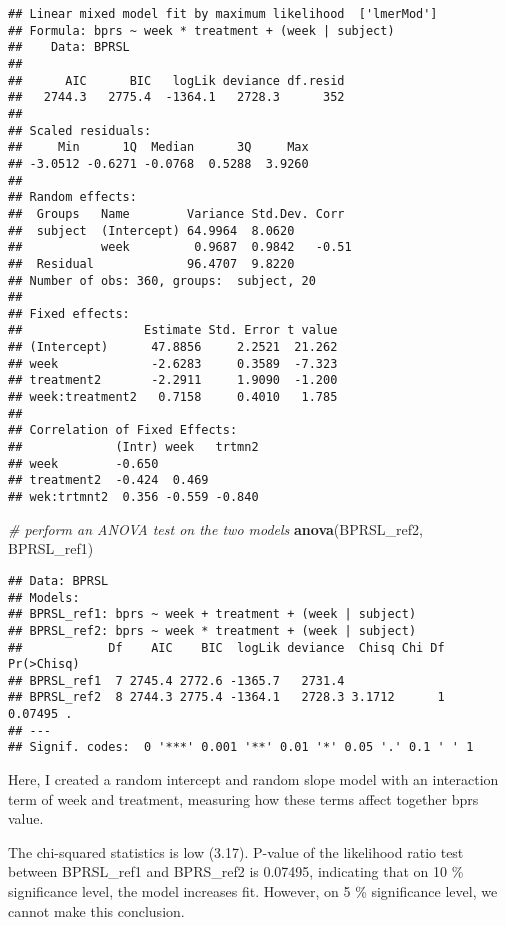 \documentclass[]{article}
\newenvironment{Shaded}{\begin{snugshade}}{\end{snugshade}}
\newcommand{\CommentTok}[1]{\textcolor[rgb]{0.56,0.35,0.01}{\textit{#1}}}
\newcommand{\KeywordTok}[1]{\textcolor[rgb]{0.13,0.29,0.53}{\textbf{#1}}}
\newcommand{\NormalTok}[1]{#1}
\begin{document}
\begin{verbatim}
## Linear mixed model fit by maximum likelihood  ['lmerMod']
## Formula: bprs ~ week * treatment + (week | subject)
##    Data: BPRSL
## 
##      AIC      BIC   logLik deviance df.resid 
##   2744.3   2775.4  -1364.1   2728.3      352 
## 
## Scaled residuals: 
##     Min      1Q  Median      3Q     Max 
## -3.0512 -0.6271 -0.0768  0.5288  3.9260 
## 
## Random effects:
##  Groups   Name        Variance Std.Dev. Corr 
##  subject  (Intercept) 64.9964  8.0620        
##           week         0.9687  0.9842   -0.51
##  Residual             96.4707  9.8220        
## Number of obs: 360, groups:  subject, 20
## 
## Fixed effects:
##                 Estimate Std. Error t value
## (Intercept)      47.8856     2.2521  21.262
## week             -2.6283     0.3589  -7.323
## treatment2       -2.2911     1.9090  -1.200
## week:treatment2   0.7158     0.4010   1.785
## 
## Correlation of Fixed Effects:
##             (Intr) week   trtmn2
## week        -0.650              
## treatment2  -0.424  0.469       
## wek:trtmnt2  0.356 -0.559 -0.840
\end{verbatim}

\begin{Shaded}
\begin{Highlighting}[]
\CommentTok{# perform an ANOVA test on the two models}
\KeywordTok{anova}\NormalTok{(BPRSL_ref2, BPRSL_ref1)}
\end{Highlighting}
\end{Shaded}

\begin{verbatim}
## Data: BPRSL
## Models:
## BPRSL_ref1: bprs ~ week + treatment + (week | subject)
## BPRSL_ref2: bprs ~ week * treatment + (week | subject)
##            Df    AIC    BIC  logLik deviance  Chisq Chi Df Pr(>Chisq)  
## BPRSL_ref1  7 2745.4 2772.6 -1365.7   2731.4                           
## BPRSL_ref2  8 2744.3 2775.4 -1364.1   2728.3 3.1712      1    0.07495 .
## ---
## Signif. codes:  0 '***' 0.001 '**' 0.01 '*' 0.05 '.' 0.1 ' ' 1
\end{verbatim}

Here, I created a random intercept and random slope model with an
interaction term of week and treatment, measuring how these terms affect
together bprs value.

The chi-squared statistics is low (3.17). P-value of the likelihood
ratio test between BPRSL\_ref1 and BPRS\_ref2 is 0.07495, indicating
that on 10 \% significance level, the model increases fit. However, on 5
\% significance level, we cannot make this conclusion.
\end{document}
